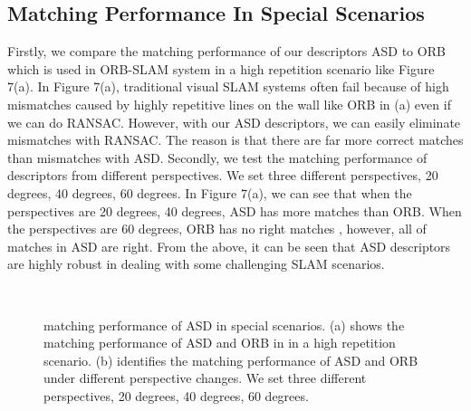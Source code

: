 \documentclass[letterpaper, 10 pt, conference]{ieeeconf}  %
\begin{document}
\subsection{Matching Performance In Special Scenarios}
Firstly, we compare the matching performance of our descriptors ASD to ORB which is used in ORB-SLAM system in a high repetition scenario like Figure 7(a).  In Figure 7(a), traditional visual SLAM systems often fail because of high mismatches caused by highly repetitive lines on the wall like ORB in (a) even if we can do RANSAC. However, with our ASD descriptors, we can easily eliminate mismatches with RANSAC. The reason is that there are far more correct matches than mismatches with ASD.
Secondly, we test the matching performance of descriptors from different perspectives. We set three different perspectives, 20 degrees, 40 degrees, 60 degrees. In Figure 7(a), we can see that when the perspectives are 20 degrees, 40 degrees, ASD has more matches than ORB. When the perspectives are 60 degrees, ORB has no right matches , however, all of matches in ASD are right. From the above, it can be seen that ASD descriptors are highly robust in dealing with some challenging SLAM scenarios.

\begin{figure}[htbp]
\centering
{}%
\\
%

\caption{matching performance of  ASD in special scenarios. (a) shows the matching performance of ASD and ORB in in a high repetition scenario.  (b) identifies the matching performance of ASD and ORB under different perspective changes. We set three different perspectives, 20 degrees,  40 degrees,  60 degrees.} 
\end{figure}
\end{document}
